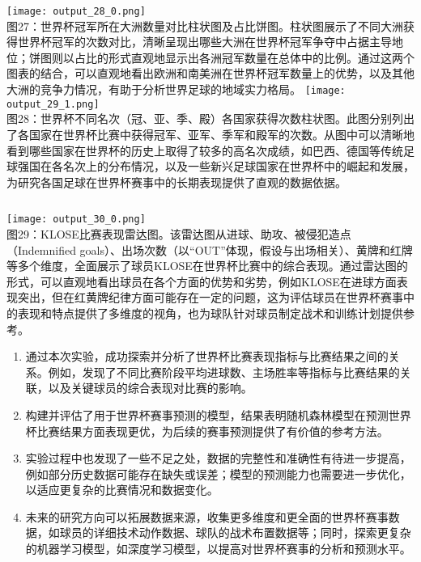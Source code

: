\documentclass{beamer}
\begin{document}
			\begin{frame}
				\begin{columns}
					\centering
					\texttt{[image: output\_28\_0.png]} \\
					\small 图27：世界杯冠军所在大洲数量对比柱状图及占比饼图。柱状图展示了不同大洲获得世界杯冠军的次数对比，清晰呈现出哪些大洲在世界杯冠军争夺中占据主导地位；饼图则以占比的形式直观地显示出各洲冠军数量在总体中的比例。通过这两个图表的结合，可以直观地看出欧洲和南美洲在世界杯冠军数量上的优势，以及其他大洲的竞争力情况，有助于分析世界足球的地域实力格局。
					\centering
					\texttt{[image: output\_29\_1.png]} \\
					\small 图28：世界杯不同名次（冠、亚、季、殿）各国家获得次数柱状图。此图分别列出了各国家在世界杯比赛中获得冠军、亚军、季军和殿军的次数。从图中可以清晰地看到哪些国家在世界杯的历史上取得了较多的高名次成绩，如巴西、德国等传统足球强国在各名次上的分布情况，以及一些新兴足球国家在世界杯中的崛起和发展，为研究各国足球在世界杯赛事中的长期表现提供了直观的数据依据。
				\end{columns}
			\end{frame}
			
			\begin{frame}
				\centering
				\texttt{[image: output\_30\_0.png]} \\
				\small 图29：KLOSE比赛表现雷达图。该雷达图从进球、助攻、被侵犯造点（Indemnified goals）、出场次数（以“OUT”体现，假设与出场相关）、黄牌和红牌等多个维度，全面展示了球员KLOSE在世界杯比赛中的综合表现。通过雷达图的形式，可以直观地看出球员在各个方面的优势和劣势，例如KLOSE在进球方面表现突出，但在红黄牌纪律方面可能存在一定的问题，这为评估球员在世界杯赛事中的表现和特点提供了多维度的视角，也为球队针对球员制定战术和训练计划提供参考。
	\end{frame}
			
			
			\begin{frame}
				\begin{enumerate}[label=\arabic*.]
					\item 通过本次实验，成功探索并分析了世界杯比赛表现指标与比赛结果之间的关系。例如，发现了不同比赛阶段平均进球数、主场胜率等指标与比赛结果的关联，以及关键球员的综合表现对比赛的影响。
					\item 构建并评估了用于世界杯赛事预测的模型，结果表明随机森林模型在预测世界杯比赛结果方面表现更优，为后续的赛事预测提供了有价值的参考方法。
					\item 实验过程中也发现了一些不足之处，数据的完整性和准确性有待进一步提高，例如部分历史数据可能存在缺失或误差；模型的预测能力也需要进一步优化，以适应更复杂的比赛情况和数据变化。
					\item 未来的研究方向可以拓展数据来源，收集更多维度和更全面的世界杯赛事数据，如球员的详细技术动作数据、球队的战术布置数据等；同时，探索更复杂的机器学习模型，如深度学习模型，以提高对世界杯赛事的分析和预测水平。
				\end{enumerate}
			\end{frame}
			
\end{document}
